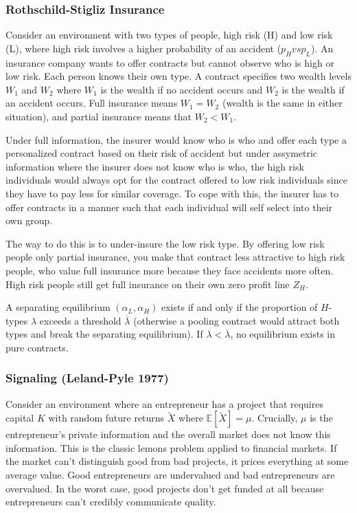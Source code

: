 \documentclass[11pt,english]{article}
\begin{document}
\subsubsection{Rothschild-Stigliz Insurance}
Consider an environment with two types of people, high risk (H) and low risk (L), where high risk involves a higher probability of an accident ($p_H vs p_L$). An insurance company wants to offer contracts but cannot observe who is high or low risk. Each person knows their own type. A contract specifies two wealth levels $W_1$ and $W_2$ where $W_1$ is the wealth if no accident occurs and $W_2$ is the wealth if an accident occurs. Full insurance means $W_1 = W_2$ (wealth is the same in either situation), and partial insurance means that $W_2 < W_1$.

Under full information, the insurer would know who is who and offer each type a personalized contract based on their risk of accident but under assymetric information where the insurer does not know who is who, the high risk individuals would always opt for the contract offered to low risk individuals since they have to pay less for similar coverage. To cope with this, the insurer has to offer contracts in a manner such that each individual will self select into their own group.

The way to do this is to under-insure the low risk type. By offering low risk people only partial insurance, you make that contract less attractive to high risk people, who value full insurance more because they face accidents more often. High risk people still get full insurance on their own zero profit line $Z_H$.

\begin{theorem}
A separating equilibrium $(\alpha_L, \alpha_H)$ exists if and only if the proportion of $H$-types $\lambda$ exceeds a threshold $\overline{\lambda}$ (otherwise a pooling contract would attract both types and break the separating equilibrium). If $\lambda < \overline{\lambda}$, no equilibrium exists in pure contracts.
\end{theorem}
\subsubsection{Signaling (Leland-Pyle 1977)}
Consider an environment where an entrepreneur has a project that requires capital $K$ with random future returns $\tilde{X}$ where $\mathbb{E}[\tilde{X}] = \mu$. Crucially, $\mu$ is the entrepreneur's private information and the overall market does not know this information. This is the classic lemons problem applied to financial markets. If the market can't distinguish good from bad projects, it prices everything at some average value. Good entrepreneurs are undervalued and bad entrepreneurs are overvalued. In the worst case, good projects don't get funded at all because entrepreneurs can't credibly communicate quality.
\end{document}
